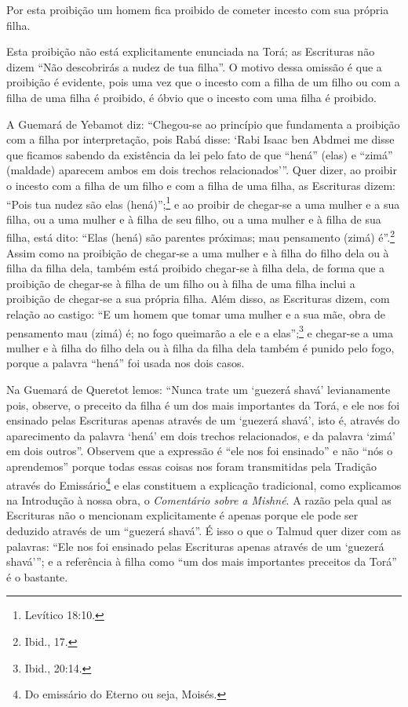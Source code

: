 Por esta proibição um homem fica proibido de cometer incesto com sua
própria filha.

Esta proibição não está explicitamente enunciada na Torá; as
Escrituras não dizem ``Não descobrirás a nudez de tua filha''. O motivo
dessa omissão é que a proibição é evidente, pois uma vez que o incesto
com a filha de um filho ou com a filha de uma filha é proibido, é óbvio
que o incesto com uma filha é proibido.

A Guemará de Yebamot diz: ``Chegou-se ao princípio que fundamenta a
proibição com a filha por interpretação, pois Rabá disse: `Rabi Isaac
ben Abdmei me disse que ficamos sabendo da existência da lei pelo fato
de que ``hená'' (elas) e ``zimá'' (maldade) aparecem ambos em dois
trechos relacionados'''. Quer dizer, ao proibir o incesto com a filha de
um filho e com a filha de uma filha, as Escrituras dizem: ``Pois tua
nudez são elas (hená)'';\footnote{Levítico 18:10.} e ao proibir de chegar-se a
uma mulher e a sua filha, ou a uma mulher e à filha de seu filho, ou a
uma mulher e à filha de sua filha, está dito: ``Elas (hená) são parentes
próximas; mau pensamento (zimá) é''.\footnote{Ibid., 17.} Assim como na proibição
de chegar-se a uma mulher e à filha do filho dela ou à filha da filha
dela, também está proibido chegar-se à filha dela, de forma que a
proibição de chegar-se à filha de um filho ou à filha de uma filha
inclui a proibição de chegar-se a sua própria filha. Além disso, as
Escrituras dizem, com relação ao castigo: ``E um homem que tomar uma
mulher e a sua mãe, obra de pensamento mau (zimá) é; no fogo queimarão a
ele e a elas'';\footnote{Ibid., 20:14.} e chegar-se a uma mulher e à filha do
filho dela ou à filha da filha dela também é punido pelo fogo, porque a
palavra ``hená'' foi usada nos dois casos.

Na Guemará de Queretot lemos: ``Nunca trate um `guezerá shavá'
levianamente pois, observe, o preceito da filha é um dos mais
importantes da Torá, e ele nos foi ensinado pelas Escrituras apenas
através de um `guezerá shavá', isto é, através do aparecimento da
palavra `hená' em dois trechos relacionados, e da palavra `zimá' em dois
outros''. Observem que a expressão é ``ele nos foi ensinado'' e não
``nós o aprendemos'' porque todas essas coisas nos foram transmitidas
pela Tradição através do Emissário\footnote{Do emissário do Eterno ou seja, Moisés.} e elas constituem a explicação tradicional, como explicamos na Introdução à
nossa obra, o \emph{Comentário sobre a Mishné}. A razão pela qual as
Escrituras não o mencionam explicitamente é apenas porque ele pode ser
deduzido através de um ``guezerá shavá''. É isso o que o Talmud quer
dizer com as palavras: ``Ele nos foi ensinado pelas Escrituras apenas
através de um `guezerá shavá'''; e a referência à filha como ``um dos
mais importantes preceitos da Torá'' é o bastante.

